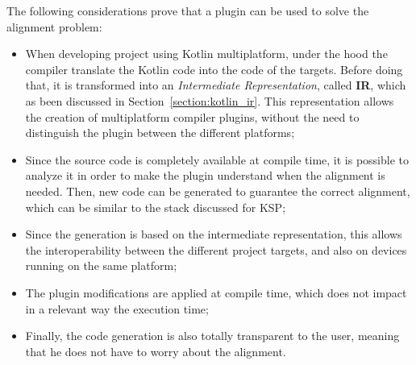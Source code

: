 The following considerations prove that a plugin can be used to solve the alignment problem:
\begin{itemize}
    \item When developing project using Kotlin multiplatform, under the hood the compiler translate the Kotlin code into the code of the targets. Before doing that, it is transformed into an \textit{Intermediate Representation}, called \textbf{IR}, which as been discussed in Section~\ref{section:kotlin_ir}. This representation allows the creation of multiplatform compiler plugins, without the need to distinguish the plugin between the different platforms;
    \item Since the source code is completely available at compile time, it is possible to analyze it in order to make the plugin understand when the alignment is needed. Then, new code can be generated to guarantee the correct alignment, which can be similar to the stack discussed for KSP; 
    \item Since the generation is based on the intermediate representation, this allows the interoperability between the different project targets, and also on devices running on the same platform;
    \item The plugin modifications are applied at compile time, which does not impact in a relevant way the execution time;
    \item Finally, the code generation is also totally transparent to the user, meaning that he does not have to worry about the alignment.
\end{itemize}

